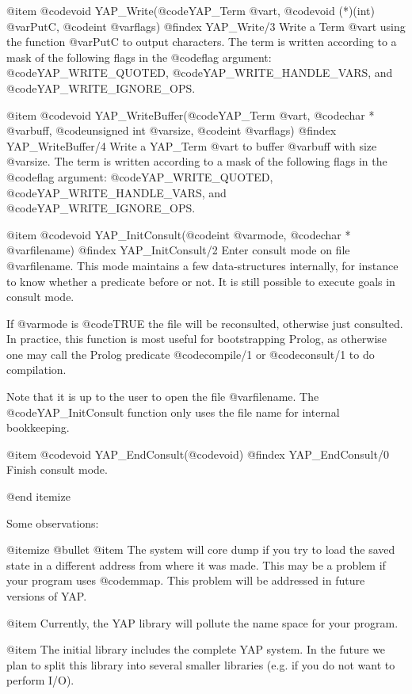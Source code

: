 {{{{{{{{{@item  @code{void} YAP_Write(@code{YAP_Term} @var{t}, @code{void (*)(int)}
@var{PutC}, @code{int} @var{flags})
@findex  YAP_Write/3
Write a Term @var{t} using the function @var{PutC} to output
characters. The term is written according to a mask of the following
flags in the @code{flag} argument: @code{YAP_WRITE_QUOTED},
@code{YAP_WRITE_HANDLE_VARS},  and @code{YAP_WRITE_IGNORE_OPS}.

@item  @code{void} YAP_WriteBuffer(@code{YAP_Term} @var{t}, @code{char *}
@var{buff}, @code{unsigned int}
@var{size}, @code{int} @var{flags})
@findex  YAP_WriteBuffer/4
Write a YAP_Term @var{t} to buffer @var{buff} with size @var{size}. The
term is written according to a mask of the following flags in the
@code{flag} argument: @code{YAP_WRITE_QUOTED},
@code{YAP_WRITE_HANDLE_VARS}, and @code{YAP_WRITE_IGNORE_OPS}.

@item  @code{void} YAP_InitConsult(@code{int} @var{mode}, @code{char *} @var{filename})
@findex YAP_InitConsult/2
Enter consult mode on file @var{filename}. This mode maintains a few
data-structures internally, for instance to know whether a predicate
before or not. It is still possible to execute goals in consult mode.

If @var{mode} is @code{TRUE} the file will be reconsulted, otherwise
just consulted. In practice, this function is most useful for
bootstrapping Prolog, as otherwise one may call the Prolog predicate
@code{compile/1} or @code{consult/1} to do compilation.

Note that it is up to the user to open the file @var{filename}. The
@code{YAP_InitConsult} function only uses the file name for internal
bookkeeping.

@item  @code{void} YAP_EndConsult(@code{void})
@findex YAP_EndConsult/0
Finish consult mode.

@end itemize

Some observations:

@itemize @bullet
@item The system will core dump if you try to load the saved state in a
different address from where it was made. This may be a problem if
your program uses @code{mmap}. This problem will be addressed in future
versions of YAP.

@item Currently, the YAP library will pollute the name
space for your program.

@item The initial library includes the complete YAP system. In
the future we plan to split this library into several smaller libraries
(e.g. if you do not want to perform I/O).

}}}}}}}}}

